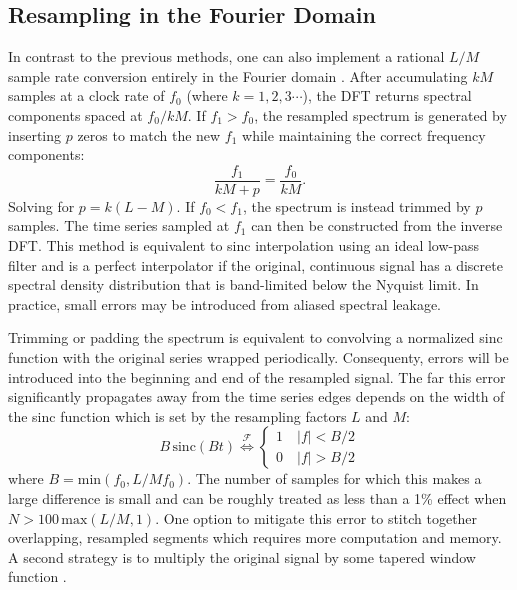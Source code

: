 \documentclass[11pt,preprint]{aastex}
\begin{document}
\subsection{Resampling in the Fourier Domain} \label{sec:fourier_resampling}
In contrast to the previous methods, one can also implement a rational $L/M$ sample rate conversion entirely in 
the Fourier domain \citep{gold69,yeh82}.  After accumulating $kM$ samples at a clock rate of $f_0$ 
(where $k=1,2,3\cdots$), the DFT 
returns spectral components spaced at $f_0/kM$.  If $f_1 > f_0$, the resampled spectrum is generated by inserting
$p$ zeros to match the new $f_1$ while maintaining the correct frequency components: 
\begin{equation}
\frac{f_1}{kM+p} = \frac{f_0}{kM}.
\end{equation} 
Solving for $p = k(L - M)$.  If $f_0 < f_1$, the spectrum is instead trimmed by $p$ samples.  The time series
sampled at $f_1$ can then be constructed from the inverse DFT.  This method is equivalent to sinc 
interpolation using an ideal low-pass filter and is a perfect interpolator
if the original, continuous signal has a discrete spectral density distribution that is band-limited below the 
Nyquist limit.  In practice, small errors may be introduced from aliased spectral leakage. 

Trimming or padding the spectrum is equivalent to convolving a normalized sinc function with the original series 
wrapped periodically.  Consequenty, errors will be introduced into the beginning and end of the
resampled signal.  The far this error significantly propagates away from the time series edges depends on the 
width of the sinc function which is set by the resampling factors $L$ and $M$: 
\begin{equation} \label{eq:sinc}
B\,\mathrm{sinc}(B t) \overset{\mathcal{F}}{\Longleftrightarrow} \begin{cases} 1 \quad |f| < B/2 \\ 0 \quad |f| > B/2 \end{cases}
\end{equation}
where $B = \mathrm{min}(f_0,L/Mf_0)$.  
The number of samples for which this makes a large difference is small and can be roughly treated as less than a 
1\% effect when $N > 100\,\mathrm{max}(L/M,1)$.  One option to mitigate this error to stitch together 
overlapping, resampled segments \citep{bi11} which requires more computation and memory.  A second strategy is to 
multiply the original signal by some tapered window function \citep{fraser89}.
\end{document}
